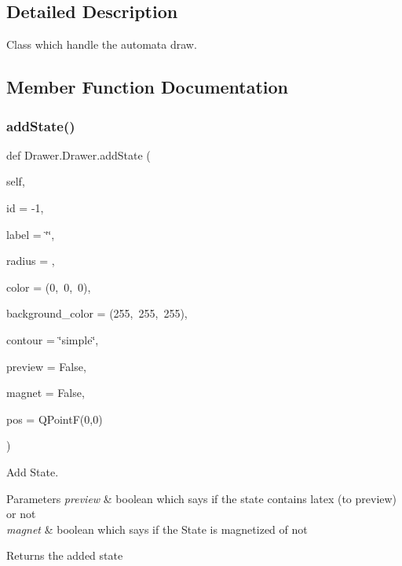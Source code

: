 \subsection{Detailed Description}
Class which handle the automata draw. 

\subsection{Member Function Documentation}
\mbox{\label{classDrawer_1_1Drawer_a1597f1f673efc6adef4ccffa4680f41e}} 
\subsubsection{\texorpdfstring{addState()}{addState()}}
{\footnotesize\ttfamily def Drawer.\+Drawer.\+add\+State (\begin{DoxyParamCaption}\item[{}]{self,  }\item[{}]{id = {\ttfamily -\/1},  }\item[{}]{label = {\ttfamily \char`\"{}\char`\"{}},  }\item[{}]{radius = {},  }\item[{}]{color = {\ttfamily (0,~0,~0)},  }\item[{}]{background\+\_\+color = {\ttfamily (255,~255,~255)},  }\item[{}]{contour = {\ttfamily \char`\"{}simple\char`\"{}},  }\item[{}]{preview = {\ttfamily False},  }\item[{}]{magnet = {\ttfamily False},  }\item[{}]{pos = {\ttfamily QPointF(0,0)} }\end{DoxyParamCaption})}



Add State. 


\begin{DoxyParams}{Parameters}
{\em preview} & boolean which says if the state contains latex (to preview) or not \\
\hline
{\em magnet} & boolean which says if the State is magnetized of not \\
\hline
\end{DoxyParams}
\begin{DoxyReturn}{Returns}
the added state 
\end{DoxyReturn}
\mbox{\label{classDrawer_1_1Drawer_aae2516d8db8154b1ec4a2396de573429}} 
